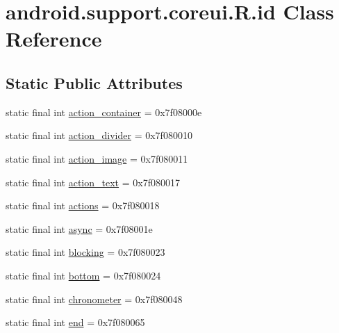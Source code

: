 \hypertarget{classandroid_1_1support_1_1coreui_1_1_r_1_1id}{}\section{android.\+support.\+coreui.\+R.\+id Class Reference}
\label{classandroid_1_1support_1_1coreui_1_1_r_1_1id}
\subsection*{Static Public Attributes}
\begin{DoxyCompactItemize}
\item 
static final int \mbox{\hyperlink{classandroid_1_1support_1_1coreui_1_1_r_1_1id_ab08f73dec2ffe5900d7e26308a41ca1a}{action\+\_\+container}} = 0x7f08000e
\item 
static final int \mbox{\hyperlink{classandroid_1_1support_1_1coreui_1_1_r_1_1id_aadbd486f98091a3758271424dee39faf}{action\+\_\+divider}} = 0x7f080010
\item 
static final int \mbox{\hyperlink{classandroid_1_1support_1_1coreui_1_1_r_1_1id_ab9210a0246b32bd9b958a161e42647f4}{action\+\_\+image}} = 0x7f080011
\item 
static final int \mbox{\hyperlink{classandroid_1_1support_1_1coreui_1_1_r_1_1id_a04ddcfd3534baf08dd481c9f6b309156}{action\+\_\+text}} = 0x7f080017
\item 
static final int \mbox{\hyperlink{classandroid_1_1support_1_1coreui_1_1_r_1_1id_a2f8a984090fad6cdcf746163f68590ce}{actions}} = 0x7f080018
\item 
static final int \mbox{\hyperlink{classandroid_1_1support_1_1coreui_1_1_r_1_1id_a6d2b515de1846dbedb9dbf58bbbb618f}{async}} = 0x7f08001e
\item 
static final int \mbox{\hyperlink{classandroid_1_1support_1_1coreui_1_1_r_1_1id_a448f92c365418e0e65bde41ec6ba7727}{blocking}} = 0x7f080023
\item 
static final int \mbox{\hyperlink{classandroid_1_1support_1_1coreui_1_1_r_1_1id_a8e839cd3fee198c2aa49ece29b128216}{bottom}} = 0x7f080024
\item 
static final int \mbox{\hyperlink{classandroid_1_1support_1_1coreui_1_1_r_1_1id_a5fe7d48ab6417172fb6efe0bb56d660c}{chronometer}} = 0x7f080048
\item 
static final int \mbox{\hyperlink{classandroid_1_1support_1_1coreui_1_1_r_1_1id_a4d58a5ca166d5967a729f592bd0ad225}{end}} = 0x7f080065
\item 

\end{DoxyCompactItemize}
